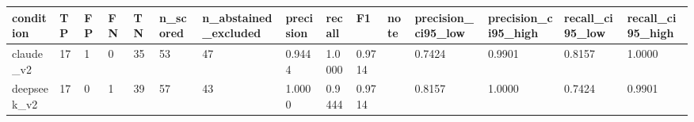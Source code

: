 \begin{table}[ht]
\centering
\begin{tabular}{lllllllllllllll}
\toprule
condition & TP & FP & FN & TN & n\_scored & n\_abstained\_excluded & precision & recall & F1 & note & precision\_ci95\_low & precision\_ci95\_high & recall\_ci95\_low & recall\_ci95\_high \\
\midrule
claude\_v2 & 17 & 1 & 0 & 35 & 53 & 47 & 0.9444 & 1.0000 & 0.9714 &  & 0.7424 & 0.9901 & 0.8157 & 1.0000 \\
deepseek\_v2 & 17 & 0 & 1 & 39 & 57 & 43 & 1.0000 & 0.9444 & 0.9714 &  & 0.8157 & 1.0000 & 0.7424 & 0.9901 \\
\bottomrule
\end{tabular}
\end{table}
